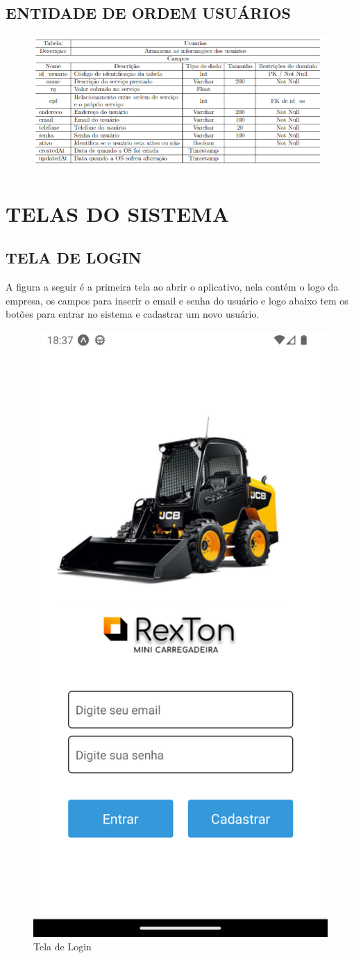 \newpage
\subsection{ENTIDADE DE ORDEM USUÁRIOS}
\begin{figure}[htb]
	\begin{center}
	    \includegraphics[width=1\linewidth]{imagens/dc5.png}
	\end{center}
\end{figure}


\newpage
\section{TELAS DO SISTEMA}
\subsection{TELA DE LOGIN}
A figura a seguir é a primeira tela ao abrir o aplicativo, nela contém o logo da empresa, os campos para inserir o email e senha do usuário e logo abaixo tem os botões para entrar no sistema e cadastrar um novo usuário.
\begin{figure}[htb]
	\caption{\label{fig_diagrama-classes} Tela de Login}
	\begin{center}
	    \includegraphics[width=0.5\linewidth]{imagens/login.png}
	\end{center}
\end{figure}

